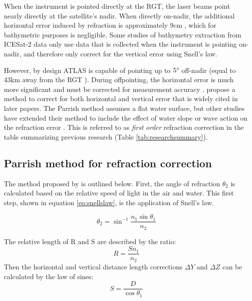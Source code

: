 When the instrument is pointed directly at the RGT, the laser beams point nearly directly at the satellite's nadir. When directly on-nadir, the additional horizontal error induced by refraction is approximately 9cm \parencite{Parrish2019}, which for bathymetric purposes is negligible. Some studies of bathymetry extraction from ICESat-2 data only use data that is collected when the instrument is pointing on-nadir, and therefore only correct for the vertical error using Snell's law.

However, by design ATLAS is capable of pointing up to $5 \degree$ off-nadir (equal to 43km away from the RGT \parencite{Magruder2021}). During offpointing, the horizontal error is much more significant and must be corrected for measurement accuracy \parencite{Parrish2019}. \citeauthor{Parrish2019} propose a method to correct for both horizontal and vertical error that is widely cited in later papers. The Parrish method assumes a flat water surface, but other studies have extended their method to include the effect of water slope or wave action on the refraction error \parencite{Ma2020,Zhang2022}.  This is referred to as \emph{first order} refraction correction in the table summarizing previous research (Table \ref{tab:researchsummary}).

\subsection{Parrish method for refraction correction}

The method proposed by \citeauthor{Parrish2019} is outlined below. First, the angle of refraction $\theta_2$ is calculated based on the relative speed of light in the air and water. This first step, shown in equation \ref{eq:snellslaw}, is the application of Snell's law.

\begin{equation}\label{eq:snellslaw}
      \theta_2 = \sin^{-1}{\frac{n_1 \sin{\theta_1}}{n_2}}
\end{equation}

The relative length of R and S are described by the ratio:
\begin{equation}
      R = \frac{S n_1}{n_2}
\end{equation}
Then the horizontal and vertical distance length corrections $\Delta Y$ and $\Delta Z$ can be calculated by the law of sines:
\begin{equation}
      S = \frac{D}{\cos{\theta_1}}
\end{equation}

